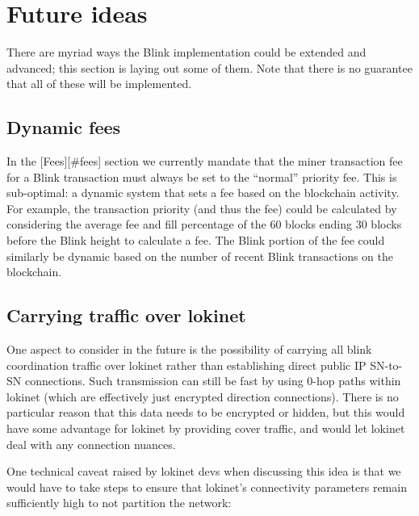 \hypertarget{future-ideas}{%
\section{Future ideas}\label{future-ideas}}

There are myriad ways the Blink implementation could be extended and
advanced; this section is laying out some of them. Note that there is no
guarantee that all of these will be implemented.

\hypertarget{dynamic-fees}{%
\subsection{Dynamic fees}\label{dynamic-fees}}

In the {[}Fees{]}{[}\#fees{]} section we currently mandate that the
miner transaction fee for a Blink transaction must always be set to the
``normal'' priority fee. This is sub-optimal: a dynamic system that sets
a fee based on the blockchain activity. For example, the transaction
priority (and thus the fee) could be calculated by considering the
average fee and fill percentage of the 60 blocks ending 30 blocks before
the Blink height to calculate a fee. The Blink portion of the fee could
similarly be dynamic based on the number of recent Blink transactions on
the blockchain.

\hypertarget{carrying-traffic-over-lokinet}{%
\subsection{Carrying traffic over
lokinet}\label{carrying-traffic-over-lokinet}}

One aspect to consider in the future is the possibility of carrying all
blink coordination traffic over lokinet rather than establishing direct
public IP SN-to-SN connections. Such transmission can still be fast by
using 0-hop paths within lokinet (which are effectively just encrypted
direction connections). There is no particular reason that this data
needs to be encrypted or hidden, but this would have some advantage for
lokinet by providing cover traffic, and would let lokinet deal with any
connection nuances.

One technical caveat raised by lokinet devs when discussing this idea is
that we would have to take steps to ensure that lokinet's connectivity
parameters remain sufficiently high to not partition the network:

